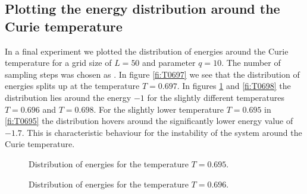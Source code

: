\subsection{Plotting the energy distribution around the Curie temperature}

In a final experiment we plotted the distribution of energies around the Curie temperature for a grid size of $L=50$ and parameter $q=10$. The number of sampling steps was chosen as . In figure \ref{fi:T0697} we see that the distribution of energies splits up at the temperature $T=0.697$. In figures \ref{fi:T0696} and \ref{fi:T0698} the distribution lies around the energy $-1$ for the slightly different temperatures $T=0.696$ and $T=0.698$. For the slightly lower temperature $T=0.695$ in \ref{fi:T0695} the distribution hovers around the significantly lower energy value of $-1.7$.
This is characteristic behaviour for the instability of the system around the Curie temperature. 

%

%

\begin{figure}
\centering
\begin{minipage}[b]{0.45\textwidth}
\centering
\graphicspath{{../../Plots/}}

\caption{Distribution of energies for the temperature  $T=0.695$.}
\label{fi:T0695}
\end{minipage}
\hfill
\begin{minipage}[b]{0.45\textwidth}
\centering
\graphicspath{{../../Plots/}}

\caption{Distribution of energies for the temperature  $T=0.696$.}
\label{fi:T0696}
\end{minipage}
\end{figure}

